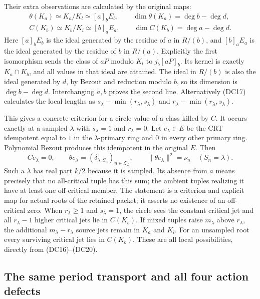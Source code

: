 \documentclass{article}
\begin{document}
Their extra observations are calculated by the original maps:
\[
 \begin{gathered}
 \theta(K_a)\simeq K_a/K_l\simeq [a]_b E_b,\qquad
 \dim\theta(K_a)=\deg b-\deg d,\\
 C(K_b)\simeq K_b/K_l\simeq [b]_a E_a,\qquad
 \dim C(K_b)=\deg a-\deg d .
 \end{gathered}
 \tag{DC20}
\]
Here $[a]_b E_b$ is the ideal generated by the residue of $a$
in $R/(b)$, and $[b]_a E_a$ is the ideal generated by the residue
of $b$ in $R/(a)$.  Explicitly the first
isomorphism sends the class of $aP$ modulo $K_l$ to
$j_b[aP]_b$.  Its kernel is exactly $K_a\cap K_b$, and all
values in that ideal are attained.  The ideal in $R/(b)$ is
also the ideal generated by $d$, by Bezout and reduction modulo
$b$, so its dimension is $\deg b-\deg d$.  Interchanging $a,b$
proves the second line.  Alternatively (DC17) calculates the
local lengths as
$s_\lambda-\min(r_\lambda,s_\lambda)$ and
$r_\lambda-\min(r_\lambda,s_\lambda)$.

This gives a concrete criterion for a circle value of a class killed
by $C$.  It occurs exactly at a sampled $\lambda$ with
$s_\lambda=1$ and $r_\lambda=0$.
Let $e_\lambda\in E$ be the CRT idempotent equal to $1$ in the
$\lambda$-primary ring and $0$ in every other primary ring.
Polynomial Bezout produces this idempotent in the original $E$.
Then
\[
 Ce_\lambda=0,\qquad
 \theta e_\lambda=(\delta_{\lambda,S_n})_{n\in\mathcal Z_L},
 \qquad
 \|\theta e_\lambda\|^2=\nu_n\quad(S_n=\lambda).
 \tag{DC21}
\]
Such a $\lambda$ has real part $k/2$ because it is sampled.
Its absence from $a$ means precisely that no all-critical tuple
has this sum; the ambient tuples realizing it have at least one
off-critical member.  The statement is a criterion and explicit
map for actual roots of the retained packet; it asserts no
existence of an off-critical zero.  When $r_\lambda\ge1$ and
$s_\lambda=1$, the circle sees the constant critical jet and all
$r_\lambda-1$ higher critical jets lie in $C(K_b)$.  If mixed
tuples raise $m_\lambda$ above $r_\lambda$, the additional
$m_\lambda-r_\lambda$ source jets remain in $K_a$ and $K_l$.
For an unsampled root every surviving critical jet lies in
$C(K_b)$.  These are all local possibilities, directly from
(DC16)--(DC20).

\subsection{The same period transport and all four action defects}
\end{document}
